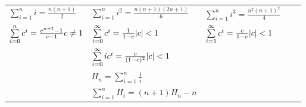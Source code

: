 \begin{expandtable}
\begin{tabularx}{\linewidth}{|XIXIX|}
	\hline
	$\sum\limits_{i = 1}^n i = \frac{n(n+1)}{2}$ &
	$\sum\limits_{i = 1}^n i^2 = \frac{n(n + 1)(2n + 1)}{6}$ &
	$\sum\limits_{i = 1}^n i^3 = \frac{n^2 (n + 1)^2}{4}$ \\
	\grayhline
	
	$\sum\limits_{i = 0}^n c^i = \frac{c^{n + 1} - 1}{c - 1} \hfill c \neq 1$ &	
	$\sum\limits_{i = 0}^\infty c^i = \frac{1}{1 - c} \hfill \vert c \vert < 1$ &
	$\sum\limits_{i = 1}^\infty c^i = \frac{c}{1 - c} \hfill \vert c \vert < 1$ \\
	\grayhline
		
	 &	
	$\sum\limits_{i = 0}^\infty ic^i = \frac{c}{(1 - c)^2} \hfill \vert c \vert < 1$ \\
	\grayhline	
	
	 &
	$H_n = \sum\limits_{i = 1}^n \frac{1}{i}$ \\
	\grayhline
	
	 &
	$\sum\limits_{i = 1}^n H_i = (n + 1)H_n - n$ \\
	\hline
\end{tabularx}
\end{expandtable}
